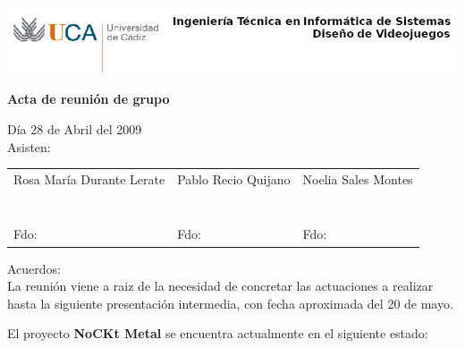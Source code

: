 \documentclass[a4paper,10pt]{article}
\begin{document}
\includegraphics[scale=0.6]{../uca.png}

\begin{center}
  \noindent \huge\textbf{ Acta de reunión de grupo}\\
\end{center}

\noindent Día 28 de Abril del 2009\\

\noindent Asisten:

\begin{center}
\begin{tabular}{|m{5.2cm}|m{5.2cm}|m{5.2cm}|}
  \hline
  Rosa María Durante Lerate & Pablo Recio Quijano & Noelia Sales Montes\\
  & & \\
  & & \\
  & & \\
  & & \\
  & & \\
  & & \\
  & & \\
  Fdo: & Fdo: & Fdo: \\
  \hline
\end{tabular}
\end{center}

\noindent Acuerdos:\\

\noindent La reunión viene a raiz de la necesidad de concretar las actuaciones
a realizar hasta la siguiente presentación intermedia, con fecha aproximada
del 20 de mayo. 

\noindent El proyecto \textbf{NoCKt Metal} se encuentra actualmente en el 
siguiente estado:
\end{document}
